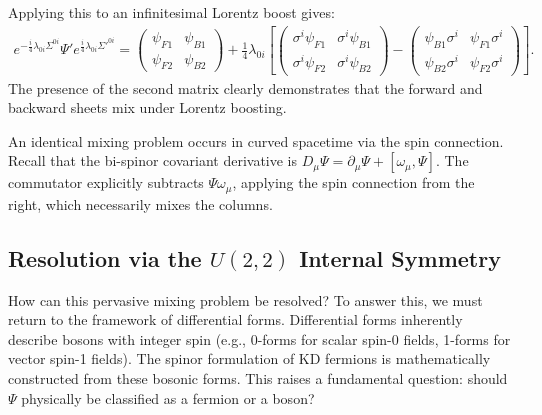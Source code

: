 Applying this to an infinitesimal Lorentz boost gives: 
\begin{equation}
\begin{aligned}
    e^{-\frac{i}{4}\lambda_{0i}\Sigma^{0i}}\Psi'e^{\frac{i}{4}\lambda_{0i}\Sigma'^{0i}}=\begin{pmatrix}\psi_{F1}&\psi_{B1}\\ \psi_{F2}&\psi_{B2}\end{pmatrix}+\frac{1}{4}\lambda_{0i}\left[\begin{pmatrix}\sigma^i\psi_{F1}&\sigma^i\psi_{B1}\\ \sigma^i\psi_{F2}&\sigma^i\psi_{B2}\end{pmatrix}-\begin{pmatrix}\psi_{B1}\sigma^i&\psi_{F1}\sigma^i\\ \psi_{B2}\sigma^i&\psi_{F2}\sigma^i\end{pmatrix}\right].
\end{aligned}
\end{equation}
The presence of the second matrix clearly demonstrates that the forward and backward sheets mix under Lorentz boosting. 

An identical mixing problem occurs in curved spacetime via the spin connection. Recall that the bi-spinor covariant derivative is $D_\mu\Psi=\partial_\mu\Psi+[\omega_\mu,\Psi]$. The commutator explicitly subtracts $\Psi\omega_\mu$, applying the spin connection from the right, which necessarily mixes the columns. 

\subsection{Resolution via the $U(2,2)$
 Internal Symmetry}\label{subsec:solution_internal_symmetry}

How can this pervasive mixing problem be resolved? To answer this, we must return to the framework of differential forms. Differential forms inherently describe bosons with integer spin (e.g., 0-forms for scalar spin-0 fields, 1-forms for vector spin-1 fields). The spinor formulation of KD fermions is mathematically constructed from these bosonic forms. This raises a fundamental question: should $\Psi$ physically be classified as a fermion or a boson? 

